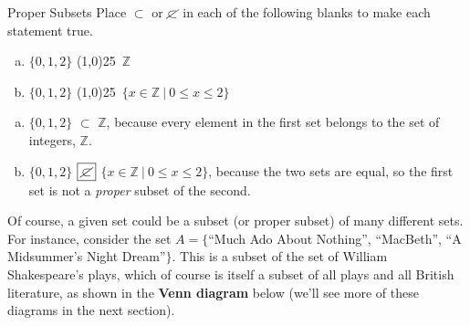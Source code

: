 \begin{example}[https://www.youtube.com/watch?v=c06crpTh6-8&list=PLfmpjsIzhztuvrh-T2Owgo_gO84qypSBG&index=6]{Proper Subsets}
Place $\subset$ or $\cancel{\subset}$ in each of the following blanks to make each statement true.\\

\begin{enumerate}[(a)]
\item $\{0,1,2\}$ \line(1,0){25}\ $\mathbb{Z}$\\

\item $\{0,1,2\}$ \line(1,0){25}\ $\{x \in \mathbb{Z} \ | \ 0 \leq x \leq 2\}$
\end{enumerate}

\sol
\begin{enumerate}[(a)]
\item $\{0,1,2\}$ $\boxed{\subset}$ $\mathbb{Z}$, because every element in the first set belongs to the set of integers, $\mathbb{Z}$.\\

\item $\{0,1,2\}$ $\boxed{\cancel{\subset}}$ $\{x \in \mathbb{Z} \ | \ 0 \leq x \leq 2\}$, because the two sets are equal, so the first set is not a \emph{proper} subset of the second.
\end{enumerate}
\end{example}

Of course, a given set could be a subset (or proper subset) of many different sets.  For instance, consider the set $A = \{$``Much Ado About Nothing'', ``MacBeth'', ``A
Midsummer's Night Dream''$\}$.  This is a subset of the set of William Shakespeare's plays, which of course is itself a subset of all plays and all British literature, as shown in the \textbf{Venn diagram} below (we'll see more of these diagrams in the next section).

\begin{center}
\end{center}
\pagebreak


